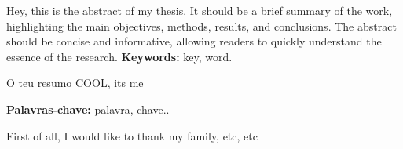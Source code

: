


Hey, this is the abstract of my thesis. It should be a brief summary of the work, highlighting the main objectives, methods, results, and conclusions. The abstract should be concise and informative, allowing readers to quickly understand the essence of the research.
\textbf{Keywords:} key, word.


O teu resumo COOL, its me

\textbf{Palavras-chave:} palavra, chave..



First of all, I would like to thank my family, etc, etc